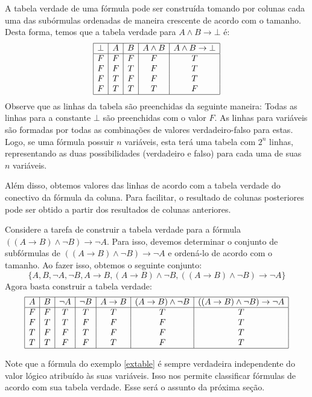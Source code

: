 A tabela verdade de uma f\'ormula pode ser constru\'ida tomando por
colunas cada uma das sub\'ormulas ordenadas de maneira crescente de
acordo com o tamanho. Desta forma, temos que a tabela verdade para
$A\land B\to \bot$ \'e:
\[
\begin{array}{|c|c|c|c|c|}
  \hline
  \bot & A & B & A\land B & A\land B \to \bot \\ \hline
   F     & F  & F &      F         &  T                            \\
   F     & F & T &       F         &   T                           \\
   F     & T & F &       F         &     T                         \\
   F     & T & T &       T         &      F                       \\ \hline
\end{array}
\]
Observe que as linhas da tabela s\~ao preenchidas da seguinte maneira:
Todas as linhas para a constante $\bot$ s\~ao preenchidas com o valor
$F$. As linhas para vari\'aveis s\~ao formadas por todas as
combina\c{c}\~oes de valores verdadeiro-falso para estas. Logo, se uma
f\'ormula possuir $n$ vari\'aveis, esta ter\'a uma tabela com $2^n$
linhas, representando as duas possibilidades (verdadeiro e falso) para
cada uma de suas $n$ vari\'aveis.

Al\'em disso, obtemos valores das linhas de acordo com a tabela
verdade do conectivo da f\'ormula da coluna. Para facilitar, o
resultado de colunas posteriores pode ser obtido a partir dos
resultados de colunas anteriores.

\begin{Example}\label{extable}
Considere a tarefa de construir a tabela verdade para a f\'ormula $((A
\to B)\land \neg B) \to \neg A$. Para isso, devemos determinar o conjunto de
subf\'ormulas de $((A\to B)\land \neg B) \to \neg A$ e orden\'a-lo de acordo
com o tamanho. Ao fazer isso, obtemos o seguinte conjunto:
\[
\{A,B,\neg A,\neg B,A\to B, (A\to B)\land \neg B,((A\to B)\land \neg
B)\to \neg A\}
\]
Agora basta construir a tabela verdade:
\[
\begin{array}{|c|c|c|c|c|c|c|}
  \hline
A & B & \neg A & \neg B & A \to B & (A \to B) \land \neg B & ((A\to
B)\land \neg B)\to \neg A\\ \hline
F & F &   T  & T & T & T & T\\
F & T &  T   & F & F  & F  & T\\
T & F &   F    &  T  &  F   & F  & T \\
T & T &   F    &  F  &  T   & F   & T \\ \hline
\end{array}
\]
\end{Example}
Note que a f\'ormula do exemplo \ref{extable} \'e sempre verdadeira
independente do valor l\'ogico atribu\'ido \`as suas vari\'aveis. Isso
nos permite classificar f\'ormulas de acordo com sua tabela
verdade. Esse ser\'a o assunto da pr\'oxima se\c{c}\~ao.

